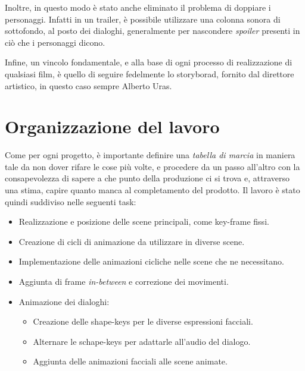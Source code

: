 Inoltre, in questo modo è stato anche eliminato il problema di doppiare i personaggi. Infatti in un trailer, è possibile utilizzare una colonna sonora di sottofondo, al posto dei dialoghi, generalmente per nascondere \emph{spoiler} presenti in ciò che i personaggi dicono.

Infine, un vincolo fondamentale, e alla base di ogni processo di realizzazione di qualsiasi film, è quello di seguire fedelmente lo storyborad, fornito dal direttore artistico, in questo caso sempre Alberto Uras.

\section{Organizzazione del lavoro}
Come per ogni progetto, è importante definire una \emph{tabella di marcia} in maniera tale da non dover rifare le cose più volte, e procedere da un passo all'altro con la consapevolezza di sapere a che punto della produzione ci si trova e, attraverso una stima, capire quanto manca al completamento del prodotto.
Il lavoro è stato quindi suddiviso nelle seguenti task:
\begin{itemize}
    \item Realizzazione e posizione delle scene principali, come key-frame fissi.
    \item Creazione di cicli di animazione da utilizzare in diverse scene.
    \item Implementazione delle animazioni cicliche nelle scene che ne necessitano.
    \item Aggiunta di frame \emph{in-between} e correzione dei movimenti.
    \item Animazione dei dialoghi:
    \begin{itemize}
        \item Creazione delle shape-keys per le diverse espressioni facciali.
        \item Alternare le schape-keys per adattarle all'audio del dialogo.
        \item Aggiunta delle animazioni facciali alle scene animate.
    \end{itemize}
\end{itemize}
